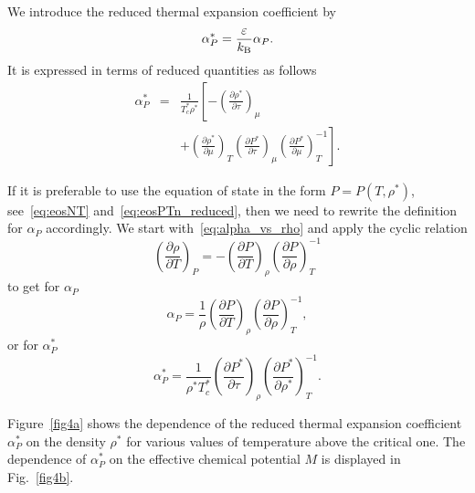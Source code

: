 \documentclass[fleqn,twoside,twocolumn,nofootinbib,showkeys]{revtex4} %
\begin{document}
	We introduce the reduced thermal expansion coefficient by
	\begin{equation}
		\alpha^*_P = \frac{\varepsilon}{k_{\rm B}} \alpha_P.
	\end{equation}
	It is expressed in terms of reduced quantities as follows
	\begin{eqnarray}
		\alpha^*_P & = & \frac{1}{T^*_c \rho^*}
		\left[ 
		-\left(\frac{\partial \rho^*}{\partial \tau}\right)_{\mu}
		\right. \nonumber\\
		&& + \left.\left(\frac{\partial \rho^*}{\partial \mu}\right)_{T}
		\left(\frac{\partial P^*}{\partial \tau}\right)_{\mu}
		\left(\frac{\partial P^*}{\partial \mu}\right)^{-1}_{T} 
		\right].
	\end{eqnarray}
	
	If it is preferable to use the equation of state in the form $P=P(T, \rho^*)$, see~\eqref{eq:eosNT} and~\eqref{eq:eosPTn_reduced}, then we need to rewrite the definition for $\alpha_P$ accordingly. We start with~\eqref{eq:alpha_vs_rho} and apply the cyclic relation
	\begin{equation}
		\left(\frac{\partial \rho}{\partial T}\right)_P = - \left(\frac{\partial P}{\partial T}\right)_{\rho} \left(\frac{\partial P}{\partial \rho}\right)^{-1}_T
	\end{equation}
	to get for $\alpha_P$
	\begin{equation}
		\alpha_P = \frac{1}{\rho} \left(\frac{\partial P}{\partial T}\right)_{\rho} \left(\frac{\partial P}{\partial \rho}\right)^{-1}_T ,
	\end{equation}
	or for $\alpha^*_P$
	\begin{equation}
		\alpha^*_P = \frac{1}{\rho^* T^*_c} \left(\frac{\partial P^*}{\partial \tau}\right)_{\rho} \left(\frac{\partial P^*}{\partial \rho^*}\right)^{-1}_T.
	\end{equation}
	
	Figure~\ref{fig4a} shows the dependence of the reduced thermal expansion coefficient $\alpha^*_P$ on the density $\rho^*$ for various values of temperature above the critical one. The dependence of $\alpha^*_P$ on the effective chemical potential $M$ is displayed in Fig.~\ref{fig4b}.
	
\end{document}
